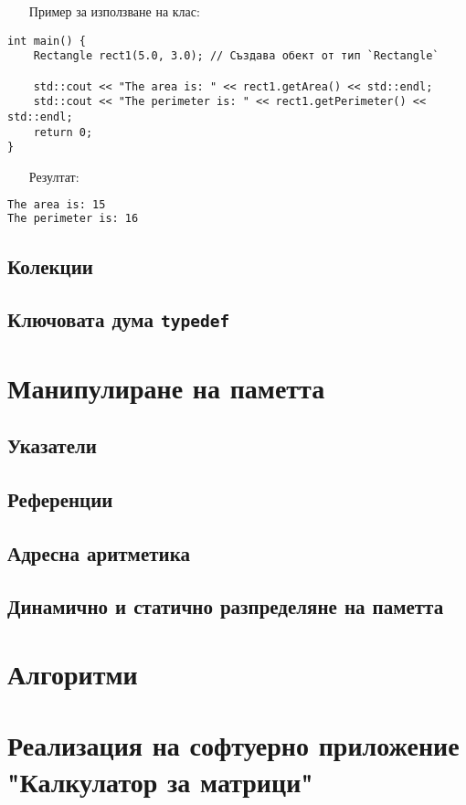 \documentclass[oneside]{book}
\newcommand*{\code}[1]{\texttt{#1}}
\begin{document}
\begin{itemize}\item[Пример] за използване на клас:\end{itemize}
\begin{mdframed}\begin{lstlisting}
int main() {
    Rectangle rect1(5.0, 3.0); // Създава обект от тип `Rectangle`

    std::cout << "The area is: " << rect1.getArea() << std::endl;
    std::cout << "The perimeter is: " << rect1.getPerimeter() << std::endl;
    return 0;
}
\end{lstlisting}\end{mdframed}

\begin{itemize}\item[Резултат:]\end{itemize}
\begin{mdframed}\begin{lstlisting}[language=bash]
The area is: 15
The perimeter is: 16
\end{lstlisting}\end{mdframed}

\section{Колекции}
\section{Ключовата дума \code{typedef}}

\chapter{Манипулиране на паметта}
\section{Указатели}\label{sec:pointers}
\section{Референции}
\section{Адресна аритметика}
\section{Динамично и статично разпределяне на паметта}\label{sec:allocation}

\chapter{Алгоритми}

\chapter*{Реализация на софтуерно приложение "Калкулатор за матрици"}
\end{document}
